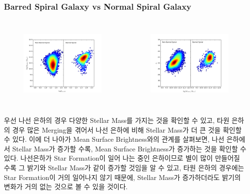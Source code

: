 \documentclass[xcolor={dvipsnames,table}]{beamer}
\newcommand\SSM{\fontsize{7}{7.2}\selectfont}
\begin{document}
\begin{frame}
 \frametitle{Barred Spiral Galaxy vs Normal Spiral Galaxy}
 \SSM
 \begin{columns}[t]
   \begin{figure}
    \centering
    \includegraphics[width=6cm, height=4cm]{sizemassdensity2.png}
   \end{figure}
   \begin{figure}
    \centering
    \includegraphics[width=6cm, height=4cm]{masssurfdensity2.png}
   \end{figure}
  \end{columns}
\vspace{0.3cm}
우선 나선 은하의 경우 다양한 Stellar Mass를 가지는 것을 확인할 수 있고, 타원 은하의 경우 많은 Merging을 겪어서 나선 은하에
비해 Stellar Mass가 더 큰 것을 확인할 수 있다. 이에 더 나아가 Mean Surface Brightness와의 관계를 살펴보면, 나선 은하에서
Stellar Mass가 증가할 수록, Mean Surface Brightness가 증가하는 것을 확인할 수 있다. 나선은하가 Star Formation이 일어
나는 중인 은하이므로 별이 많이 만들어질 수록 그 밝기와 Stellar Mass가 같이 증가할 것임을 알 수 있고, 타원 은하의 경우에는
Star Formation이 거의 일어나지 않기 때문에, Stellar Mass가 증가하더라도 밝기의 변화가 거의 없는 것으로 볼 수 있을 것이다.
\end{frame}
\end{document}
